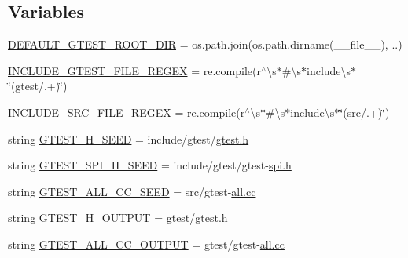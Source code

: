 \subsection*{Variables}
\begin{DoxyCompactItemize}
\item 
\hyperlink{namespacefuse__gtest__files_a68085bdb2912baa7e71d2b3eb37b05c9}{D\+E\+F\+A\+U\+L\+T\+\_\+\+G\+T\+E\+S\+T\+\_\+\+R\+O\+O\+T\+\_\+\+D\+IR} = os.\+path.\+join(os.\+path.\+dirname(\+\_\+\+\_\+file\+\_\+\+\_\+), \textquotesingle{}..\textquotesingle{})
\item 
\hyperlink{namespacefuse__gtest__files_ad7abe9bfa06bb1c5411e8b4a7a686e5b}{I\+N\+C\+L\+U\+D\+E\+\_\+\+G\+T\+E\+S\+T\+\_\+\+F\+I\+L\+E\+\_\+\+R\+E\+G\+EX} = re.\+compile(r\textquotesingle{}$^\wedge$\textbackslash{}s$\ast$\#\textbackslash{}s$\ast$include\textbackslash{}s$\ast$\char`\"{}(gtest/.+)\char`\"{}\textquotesingle{})
\item 
\hyperlink{namespacefuse__gtest__files_aec4e054d0ab27276d6150468bb98a8a4}{I\+N\+C\+L\+U\+D\+E\+\_\+\+S\+R\+C\+\_\+\+F\+I\+L\+E\+\_\+\+R\+E\+G\+EX} = re.\+compile(r\textquotesingle{}$^\wedge$\textbackslash{}s$\ast$\#\textbackslash{}s$\ast$include\textbackslash{}s$\ast$\char`\"{}(src/.+)\char`\"{}\textquotesingle{})
\item 
string \hyperlink{namespacefuse__gtest__files_ad897bce28100f2b97216929013519181}{G\+T\+E\+S\+T\+\_\+\+H\+\_\+\+S\+E\+ED} = \textquotesingle{}include/gtest/\hyperlink{defines__3_8js_ae2a90576a00c74b62070401964c54a5d}{gtest.\+h}\textquotesingle{}
\item 
string \hyperlink{namespacefuse__gtest__files_a891d03ce9cfe3577cb4c193f9544f17f}{G\+T\+E\+S\+T\+\_\+\+S\+P\+I\+\_\+\+H\+\_\+\+S\+E\+ED} = \textquotesingle{}include/gtest/gtest-\/\hyperlink{defines__3_8js_ae2a90576a00c74b62070401964c54a5d}{spi.\+h}\textquotesingle{}
\item 
string \hyperlink{namespacefuse__gtest__files_a162a6031d0d5743a37a4f79227d5e916}{G\+T\+E\+S\+T\+\_\+\+A\+L\+L\+\_\+\+C\+C\+\_\+\+S\+E\+ED} = \textquotesingle{}src/gtest-\/\hyperlink{functions__9_8js_a7cdcac44c024d7db46310842bb60a454}{all.\+cc}\textquotesingle{}
\item 
string \hyperlink{namespacefuse__gtest__files_a16437f87d0f7a9800885a9082a0b773e}{G\+T\+E\+S\+T\+\_\+\+H\+\_\+\+O\+U\+T\+P\+UT} = \textquotesingle{}gtest/\hyperlink{defines__3_8js_ae2a90576a00c74b62070401964c54a5d}{gtest.\+h}\textquotesingle{}
\item 
string \hyperlink{namespacefuse__gtest__files_aa66c14474599109c46ec24eaa0ad4217}{G\+T\+E\+S\+T\+\_\+\+A\+L\+L\+\_\+\+C\+C\+\_\+\+O\+U\+T\+P\+UT} = \textquotesingle{}gtest/gtest-\/\hyperlink{functions__9_8js_a7cdcac44c024d7db46310842bb60a454}{all.\+cc}\textquotesingle{}
\end{DoxyCompactItemize}


